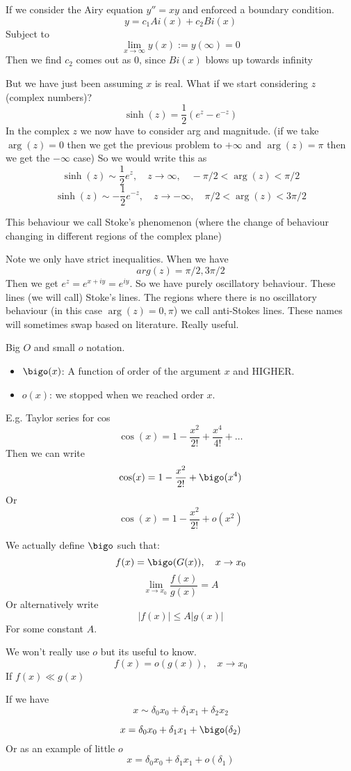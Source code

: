 \documentclass{X:/Documents/Coding/Latex/myassignment}
\begin{document}
If we consider the Airy equation $y'' = xy$ and enforced a boundary condition.
\[y = c_1 Ai(x) + c_2 Bi(x)\]
Subject to
\[\lim_{x\to\infty} y(x) :=y(\infty) = 0\]
Then we find $c_2$ comes out as $0$, since $Bi(x)$ blows up towards infinity


But we have just been assuming $x$ is real. What if we start considering $z$ (complex numbers)?
\[\sinh(z) = \frac12 (e^{z} - e^{-z})\]
In the complex $z$ we now have to consider arg and magnitude.
(if we take $\arg(z) = 0$ then we get the previous problem to $+\infty$ and $\arg(z)=\pi$ then we get the $-\infty$ case)
So we would write this as
\[\sinh(z) \sim \frac12 e^{z}, \quad z\to \infty,\quad  -\pi/2 <\arg(z) < \pi/2 \]
\[\sinh(z) \sim -\frac12 e^{-z}, \quad z\to -\infty,\quad  \pi/2 <\arg(z) < 3\pi/2 \]

This behaviour we call Stoke's phenomenon (where the change of behaviour changing in different regions of the complex plane)

Note we only have strict inequalities. When we have \[arg(z) = \pi/2, 3\pi/2\]
Then we get $e^{z} = e^{x+iy} = e^{iy}$. So we have purely oscillatory behaviour. These lines (we will call) Stoke's lines. The regions where there is no oscillatory behaviour (in this case $\arg(z) = 0,\pi$) we call anti-Stokes lines.
These names will sometimes swap based on literature. Really useful.


Big $O$ and small $o$ notation.
\begin{itemize}
    \item $\bigo(x)$: A function of order of the argument $x$ and HIGHER. 
    \item $o(x)$: we stopped when we reached order $x$. 
\end{itemize}
E.g. Taylor series for cos
\[\cos(x) = 1 - \frac{x^2}{2!} + \frac{x^4}{4!} + \hdots\]
Then we can write
\[\cos(x) = 1 - \frac{x^2}{2!} + \bigo(x^4)\]
Or
\[\cos(x) = 1 - \frac{x^2}{2!} + o(x^2)\]

We actually define $\bigo$ such that:
\[f(x) = \bigo(G(x)), \quad x\to x_0\]
\[\lim_{x\to x_0} \frac{f(x)}{g(x)} = A\]
Or alternatively write
\[|f(x)| \leq A |g(x)|\]
For some constant $A$.

We won't really use $o$ but its useful to know.
\[f(x) = o(g(x)), \quad x\to x_0\]
If $f(x) \ll g(x)$

If we have
\[x \sim \delta_0 x_0 + \delta_1 x_1 + \delta_2 x_2\]


\[x = \delta_0 x_0 + \delta_1 x_1 + \bigo(\delta_2)\]
Or as an example of little $o$
\[x = \delta_0 x_0 + \delta_1 x_1 + o(\delta_1)\]
\end{document}
